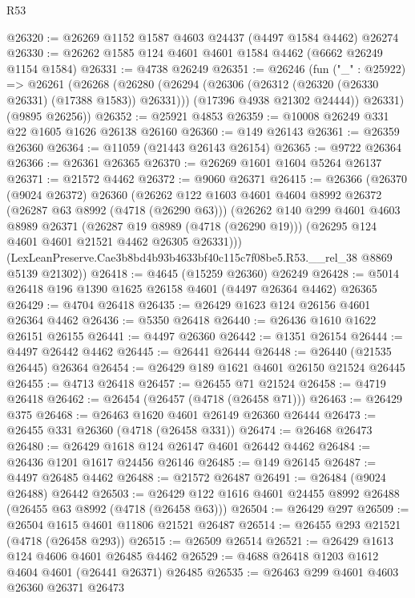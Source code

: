 \begin{lexlean}{R53}
\begin{coremodule}
@26320 := @26269 @1152 @1587 @4603 @24437 (@4497 @1584 @4462) @26274
@26330 := @26262 @1585 @124 @4601 @4601 @1584 @4462 (@6662 @26249 @1154 @1584)
@26331 := @4738 @26249
@26351 := @26246
    (fun ("_" : @25922) =>
    @26261
      (@26268
        (@26280
          (@26294 (@26306 (@26312 (@26320 (@26330 @26331) (@17388 @1583)) @26331)))
          (@17396 @4938 @21302 @24444))
        @26331)
      (@9895 @26256))
@26352 := @25921 @4853
@26359 := @10008 @26249 @331 @22 @1605 @1626 @26138 @26160
@26360 := @149 @26143
@26361 := @26359 @26360
@26364 := @11059 (@21443 @26143 @26154)
@26365 := @9722 @26364
@26366 := @26361 @26365
@26370 := @26269 @1601 @1604 @5264 @26137
@26371 := @21572 @4462
@26372 := @9060 @26371
@26415 := @26366
    (@26370
      (@9024 @26372)
      @26360
      (@26262
        @122
        @1603
        @4601
        @4604
        @8992
        @26372
        (@26287 @63 @8992 (@4718 (@26290 @63)))
        (@26262
          @140
          @299
          @4601
          @4603
          @8989
          @26371
          (@26287 @19 @8989 (@4718 (@26290 @19)))
          (@26295 @124 @4601 @4601 @21521 @4462 @26305 @26331)))
      (LexLeanPreserve.Cae3b8bd4b93b4633bf40c115c7f08be5.R53.__rel_38 @8869 @5139 @21302))
@26418 := @4645 (@15259 @26360) @26249
@26428 := @5014 @26418 @196 @1390 @1625 @26158 @4601 (@4497 @26364 @4462) @26365
@26429 := @4704 @26418
@26435 := @26429 @1623 @124 @26156 @4601 @26364 @4462
@26436 := @5350 @26418
@26440 := @26436 @1610 @1622 @26151 @26155
@26441 := @4497 @26360
@26442 := @1351 @26154
@26444 := @4497 @26442 @4462
@26445 := @26441 @26444
@26448 := @26440 (@21535 @26445) @26364
@26454 := @26429 @189 @1621 @4601 @26150 @21524 @26445
@26455 := @4713 @26418
@26457 := @26455 @71 @21524
@26458 := @4719 @26418
@26462 := @26454 (@26457 (@4718 (@26458 @71)))
@26463 := @26429 @375
@26468 := @26463 @1620 @4601 @26149 @26360 @26444
@26473 := @26455 @331 @26360 (@4718 (@26458 @331))
@26474 := @26468 @26473
@26480 := @26429 @1618 @124 @26147 @4601 @26442 @4462
@26484 := @26436 @1201 @1617 @24456 @26146
@26485 := @149 @26145
@26487 := @4497 @26485 @4462
@26488 := @21572 @26487
@26491 := @26484 (@9024 @26488) @26442
@26503 := @26429 @122 @1616 @4601 @24455 @8992 @26488 (@26455 @63 @8992 (@4718 (@26458 @63)))
@26504 := @26429 @297
@26509 := @26504 @1615 @4601 @11806 @21521 @26487
@26514 := @26455 @293 @21521 (@4718 (@26458 @293))
@26515 := @26509 @26514
@26521 := @26429 @1613 @124 @4606 @4601 @26485 @4462
@26529 := @4688 @26418 @1203 @1612 @4604 @4601 (@26441 @26371) @26485
@26535 := @26463 @299 @4601 @4603 @26360 @26371 @26473

\end{coremodule}
\end{lexlean}

